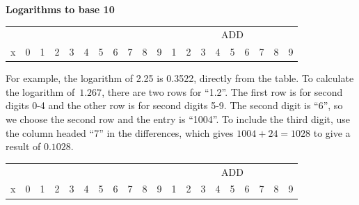 \documentclass[10pt]{article}
\begin{document}
\begin{center}
  {\Large\bf Logarithms to base 10}
\end{center}

\pagestyle{empty}
\thispagestyle{empty}
\begin{centering}
  {\small
\begin{tabular}{|r|c|ccc|ccc|ccc|ccccccccc|}\hline
  &&&&&&&&&&&  \multicolumn{9}{|c|}{ADD} \\
  {\normalsize x}&
  {\normalsize 0}&{\normalsize 1}&{\normalsize 2}&
  {\normalsize 3}&{\normalsize 4}&{\normalsize 5}&
  {\normalsize 6}&{\normalsize 7}&{\normalsize 8}&
  {\normalsize 9}&{\normalsize 1}&{\normalsize 2}&
  {\normalsize 3}&{\normalsize 4}&{\normalsize 5}&
  {\normalsize 6}&{\normalsize 7}&{\normalsize 8}&
  {\normalsize 9}\\ \hline

\hline
\end{tabular}
}
\end{centering}

\noindent\rule{0mm}{5mm}
For example, the logarithm of 2.25 is 0.3522, directly from
the table.  To calculate the logarithm of~$1.267$, there are two rows
for ``1.2''.  The first row is for second digits 0-4 and the other row
is for second digits 5-9.  The second digit is ``6'', so we choose the
second row and the entry is ``1004''.  To include the third digit, use
the column headed ``7'' in the differences, which gives $1004+24=1028$
to give a result of $0.1028$.


  \centering
  \small
\begin{tabular}{|r|c|ccc|ccc|ccc|ccccccccc|}\hline
  &&&&&&&&&&&  \multicolumn{9}{|c|}{ADD} \\
  {\normalsize x}&
  {\normalsize 0}&{\normalsize 1}&{\normalsize 2}&
  {\normalsize 3}&{\normalsize 4}&{\normalsize 5}&
  {\normalsize 6}&{\normalsize 7}&{\normalsize 8}&
  {\normalsize 9}&{\normalsize 1}&{\normalsize 2}&
  {\normalsize 3}&{\normalsize 4}&{\normalsize 5}&
  {\normalsize 6}&{\normalsize 7}&{\normalsize 8}&
  {\normalsize 9}\\ \hline

\hline
\end{tabular}
\end{document}
